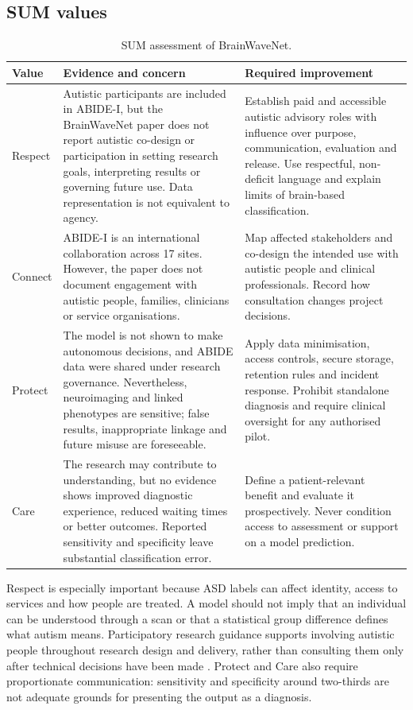 \documentclass[11pt,a4paper]{article}
\begin{document}
\subsection{SUM values}
\begin{table}[H]
\centering
\caption{SUM assessment of BrainWaveNet.}
\label{tab:sum}
\small
\begin{tabularx}{\textwidth}{p{2.2cm}Y Y}
\toprule
\textbf{Value} & \textbf{Evidence and concern} & \textbf{Required improvement}\\
\midrule
Respect & Autistic participants are included in ABIDE-I, but the BrainWaveNet paper does not report autistic co-design or participation in setting research goals, interpreting results or governing future use. Data representation is not equivalent to agency. & Establish paid and accessible autistic advisory roles with influence over purpose, communication, evaluation and release. Use respectful, non-deficit language and explain limits of brain-based classification.\\
Connect & ABIDE-I is an international collaboration across 17 sites. However, the paper does not document engagement with autistic people, families, clinicians or service organisations. & Map affected stakeholders and co-design the intended use with autistic people and clinical professionals. Record how consultation changes project decisions.\\
Protect & The model is not shown to make autonomous decisions, and ABIDE data were shared under research governance. Nevertheless, neuroimaging and linked phenotypes are sensitive; false results, inappropriate linkage and future misuse are foreseeable. & Apply data minimisation, access controls, secure storage, retention rules and incident response. Prohibit standalone diagnosis and require clinical oversight for any authorised pilot.\\
Care & The research may contribute to understanding, but no evidence shows improved diagnostic experience, reduced waiting times or better outcomes. Reported sensitivity and specificity leave substantial classification error. & Define a patient-relevant benefit and evaluate it prospectively. Never condition access to assessment or support on a model prediction.\\
\bottomrule
\end{tabularx}
\end{table}

Respect is especially important because ASD labels can affect identity, access to services and how people are treated. A model should not imply that an individual can be understood through a scan or that a statistical group difference defines what autism means. Participatory research guidance supports involving autistic people throughout research design and delivery, rather than consulting them only after technical decisions have been made \parencite{albacete2024}. Protect and Care also require proportionate communication: sensitivity and specificity around two-thirds are not adequate grounds for presenting the output as a diagnosis.
\end{document}
